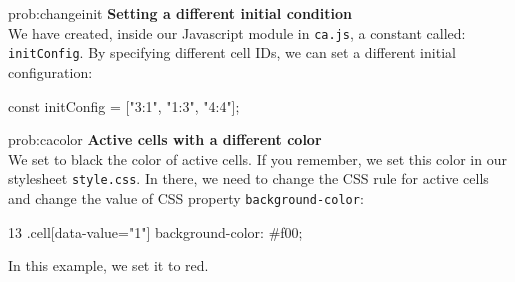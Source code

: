 \begin{sol}{prob:changeinit}
\textbf{Setting a different initial condition}\\
We have created, inside our Javascript module in \texttt{ca.js}, a constant called: \texttt{initConfig}.
By specifying different cell IDs, we can set a different initial configuration:
\begin{code}
const initConfig = ["3:1", "1:3", "4:4"];
\end{code}
\end{sol}

\begin{sol}{prob:cacolor}
\textbf{Active cells with a different color}\\
We set to black the color of active cells. If you remember, we set this color in our stylesheet
\texttt{style.css}. In there, we need to change the CSS rule for active cells and change the value
of CSS property \texttt{background-color}:
\begin{codeh1}{1}{3}
.cell[data-value="1"] {
  background-color: #f00;
}
\end{codeh1}
In this example, we set it to red.
\end{sol}

